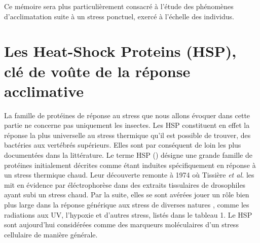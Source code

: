Ce mémoire sera plus particulièrement consacré à l'étude des
phénomènes
d'acclimatation suite à un stress ponctuel, exercé à l'échelle des individus.



%			

		\section{Les Heat-Shock Proteins (HSP), clé de voûte de la réponse acclimative} %
		\label{sec:generalites_HSP}
%			

La famille de protéines de réponse au stress que nous allons évoquer dans cette partie ne concerne pas uniquement les insectes.
Les HSP constituent en effet la réponse la plus universelle au stress thermique qu'il est possible de trouver, des bactéries aux vertébrés supérieurs.
Elles sont par conséquent de loin les plus documentées dans la littérature.
Le terme HSP () désigne une grande famille de
protéines initialement décrites comme étant induites spécifiquement en réponse à un
stress thermique chaud.
Leur découverte \cite{tissieres1974} remonte à 1974 où Tissière \textit{et al.} les mit en évidence par éléctrophorèse dans des extraits tissulaires de drosophiles ayant subi un stress chaud.
Par la suite, elles se sont avérées jouer un rôle bien
plus large\cite{zhang2011} dans la réponse générique aux stress de diverses
natures \cite{sorensen2003}, comme les radiations aux UV, l'hypoxie et d'autres stress, listés dans le tableau 1.
Le HSP sont aujourd'hui considérées comme des marqueurs moléculaires d'un stress cellulaire de manière générale.

